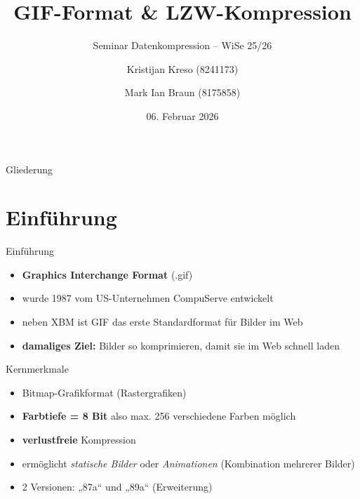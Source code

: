 \documentclass[aspectratio=169]{beamer}
\title{\textsc{GIF}-Format \& LZW-Kompression}
\subtitle{Seminar Datenkompression -- WiSe 25/26}
\author[Kreso \& Braun]{Kristijan Kreso (8241173) \and Mark Ian Braun (8175858)}
\institute[Seminar Datenkompression]{Fachbereich Informatik}
\date{06. Februar 2026}
\begin{document}
\nocite{*}

\begin{frame}
\titlepage
\end{frame}

\begin{frame}{Gliederung}
\tableofcontents
\end{frame}


\section{Einführung}

\begin{frame}{Einführung}
    \begin{itemize}
        \item \textbf{Graphics Interchange Format} (.gif)
        \item wurde 1987 vom US-Unternehmen CompuServe entwickelt
        \item neben XBM ist GIF das erste Standardformat für Bilder im Web
        \item \textbf{damaliges Ziel:} Bilder so komprimieren, damit sie im Web schnell laden
    \end{itemize}
\end{frame}

\begin{frame}{Kernmerkmale}
    \begin{itemize}
        \item Bitmap-Grafikformat (Rastergrafiken)
        \item \textbf{Farbtiefe = 8 Bit} also max. 256 verschiedene Farben möglich
        \item \textbf{verlustfreie} Kompression
        \item ermöglicht \textit{statische Bilder} oder \textit{Animationen} (Kombination mehrerer Bilder)
        \item 2 Versionen: „87a“ und „89a“ (Erweiterung)
    \end{itemize}
\end{frame}
\end{document}
